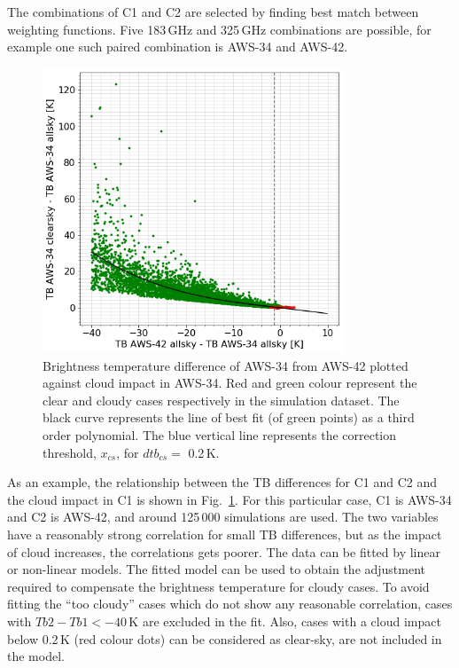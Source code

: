 \documentclass[12pt]{article}
\begin{document}
The combinations of C1 and C2 are selected by finding best match between
weighting functions. Five 183\,GHz and 325\,GHz combinations are possible, for
example one such paired combination is AWS-34 and AWS-42.

\begin{figure}[!tb]
	\centering
	\includegraphics[height=85mm]{fit_AWS-34_AWS-42}\hspace{5mm}%
	\caption{Brightness temperature difference of AWS-34 from AWS-42 plotted
      against cloud impact in AWS-34. Red and green colour represent the clear
      and cloudy cases respectively in the simulation dataset. The black curve
      represents the line of best fit (of green points) as a third order
      polynomial. The blue vertical line represents the correction threshold,
      $x_{cs}$, for $dtb_{cs} =$ 0.2\,K. }
	\label{fig:fit:c34-42}
\end{figure}
%

As an example, the relationship between the TB differences for C1 and C2 and
the cloud impact in C1 is shown in Fig.~\ref{fig:fit:c34-42}. For this
particular case, C1 is AWS-34 and C2 is AWS-42, and around 125\,000 simulations
are used. The two variables have a reasonably strong correlation for small TB
differences, but as the impact of cloud increases, the correlations gets
poorer. The data can be fitted by linear or non-linear models. The fitted model
can be used to obtain the adjustment required to compensate the brightness
temperature for cloudy cases. To avoid fitting the ``too cloudy'' cases which
do not show any reasonable correlation, cases with $Tb2-Tb1< -40$\,K are
excluded in the fit. Also, cases with a cloud impact below 0.2\,K (red colour
dots) can be considered as clear-sky, are not included in the model.
\end{document}
